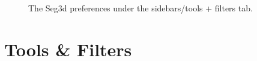 \documentclass[fleqn,11pt,openany]{book}
\begin{document}
\begin{figure}[h!]
\caption{The Seg3d preferences under the sidebars/tools + filters tab.}\label{fig:Pref_side}
\end{figure}






\chapter{Tools \& Filters}
\label{sec:tools_filters}
\end{document}
